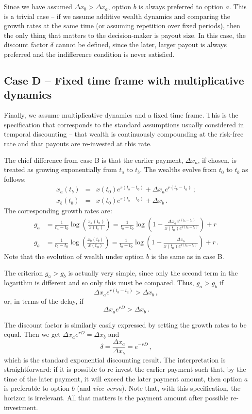 \documentclass[11pt]{article}
\newcommand{\be}{\begin{equation}}
\newcommand{\ee}{\end{equation}}
\newcommand{\bea}{\begin{eqnarray}}
\newcommand{\eea}{\end{eqnarray}}
\newcommand{\Dx}{\Delta x}
\newcommand{\del}{D}
\numberwithin{equation}{section}
\begin{document}
Since we have assumed $\Dx_b > \Dx_a$, option $b$ is always preferred to option $a$. This is a trivial case -- if we assume additive wealth dynamics and comparing the growth rates at the same time (or assuming repetition over fixed periods), then the only thing that matters to the decision-maker is payout size. In this case, the discount factor $\delta$ cannot be defined, since the later, larger payout is always preferred and the indifference condition is never satisfied.

\subsection{Case D -- Fixed time frame with multiplicative dynamics}\label{sec:case_D}

Finally, we assume multiplicative dynamics and a fixed time frame. This is the specification that corresponds to the standard assumptions usually considered in temporal discounting -- that wealth is continuously compounding at the risk-free rate and that payouts are re-invested at this rate.

The chief difference from case B is that the earlier payment, $\Dx_a$, if chosen, is treated as growing exponentially from $t_a$ to $t_b$. The wealths evolve from $t_0$ to $t_b$ as follows:
\bea
x_a\left(t_b\right) &=& x\left(t_0\right) e^{r(t_b-t_0)} + \Dx_a e^{r(t_b-t_a)}\,;\\
x_b\left(t_b\right) &=& x\left(t_0\right) e^{r(t_b-t_0)} + \Dx_b\,.
\eea
The corresponding growth rates are:
\bea
g_a &= \frac{1}{t_a-t_0} \log{\left(\frac{x_a\left(t_a\right)}{x\left(t_0\right)}\right)} = \frac{1}{t_b-t_0}\log{\left(1 + \frac{\Dx_a e^{r(t_b-t_a)}}{x\left(t_0\right)e^{r(t_b-t_0)}}\right)} + r\\
g_b &= \frac{1}{t_b-t_0} \log{\left(\frac{x_b\left(t_b\right)}{x\left(t_0\right)}\right)} = \frac{1}{t_b-t_0}\log{\left(1 + \frac{\Dx_b}{x\left(t_0\right)e^{r(t_b-t_0)}}\right)} + r\,.
\eea
Note that the evolution of wealth under option $b$ is the same as in case B.


The criterion $g_a > g_b$ is actually very simple, since only the second term in the logarithm is different and so only this must be compared. Thus, $g_a > g_b$ if
\be
\Dx_a e^{r(t_b-t_a)} > \Dx_b\,,
\ee
or, in terms of the delay, if
\be
\Dx_a e^{r\del} > \Dx_b\,.
\ee

The discount factor is similarly easily expressed by setting the growth rates to be equal. Then we get $\Dx_a e^{r\del} = \Dx_b$ and
\be
\delta = \frac{\Dx_a}{\Dx_b} = e^{-r\del}\,,
\ee
which is the standard exponential discounting result. The interpretation is straightforward: if it is possible to re-invest the earlier payment such that, by the time of the later payment, it will exceed the later payment amount, then option $a$ is preferable to option $b$ (and \textit{vice versa}). Note that, with this specification, the horizon is irrelevant. All that matters is the payment amount after possible re-investment.
\end{document}
